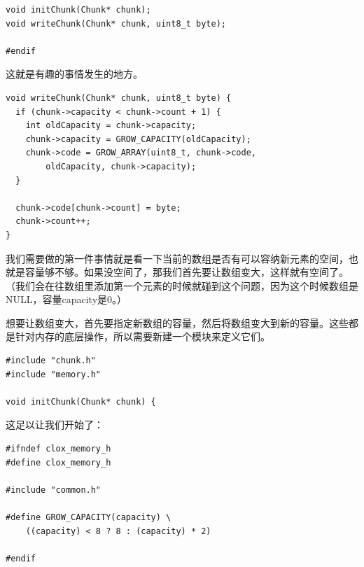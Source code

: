 \documentclass[cn,10pt,math=newtx,citestyle=gb7714-2015,bibstyle=gb7714-2015]{elegantbook}
\newenvironment{code}{\captionsetup{type=listing}}{}
\begin{document}
\begin{code}
\begin{verbatim}
void initChunk(Chunk* chunk);
void writeChunk(Chunk* chunk, uint8_t byte);

#endif
\end{verbatim}
\end{code}

这就是有趣的事情发生的地方。

\begin{code}
\begin{verbatim}
void writeChunk(Chunk* chunk, uint8_t byte) {
  if (chunk->capacity < chunk->count + 1) {
    int oldCapacity = chunk->capacity;
    chunk->capacity = GROW_CAPACITY(oldCapacity);
    chunk->code = GROW_ARRAY(uint8_t, chunk->code,
        oldCapacity, chunk->capacity);
  }

  chunk->code[chunk->count] = byte;
  chunk->count++;
}
\end{verbatim}
\end{code}

我们需要做的第一件事情就是看一下当前的数组是否有可以容纳新元素的空间，也就是容量够不够。如果没空间了，那我们首先要让数组变大，这样就有空间了。（我们会在往数组里添加第一个元素的时候就碰到这个问题，因为这个时候数组是NULL，容量capacity是0。）

想要让数组变大，首先要指定新数组的容量，然后将数组变大到新的容量。这些都是针对内存的底层操作，所以需要新建一个模块来定义它们。

\begin{code}
\begin{verbatim}
#include "chunk.h"
#include "memory.h"

void initChunk(Chunk* chunk) {
\end{verbatim}
\end{code}

这足以让我们开始了：

\begin{code}
\begin{verbatim}
#ifndef clox_memory_h
#define clox_memory_h

#include "common.h"

#define GROW_CAPACITY(capacity) \
    ((capacity) < 8 ? 8 : (capacity) * 2)

#endif
\end{verbatim}
\end{code}
\end{document}
